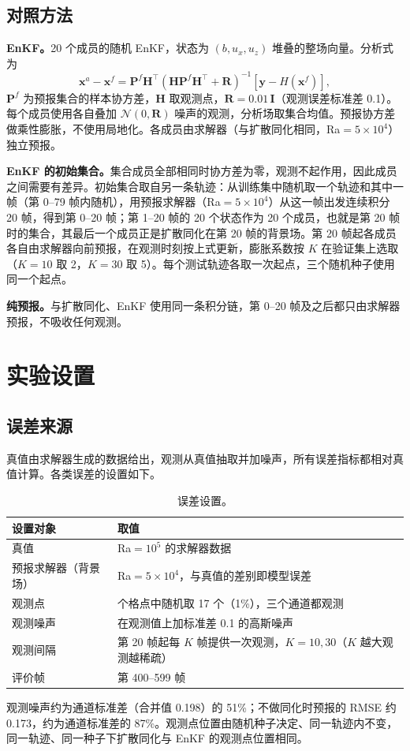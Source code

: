 \documentclass[10.5pt,a4paper]{article}
\begin{document}
\subsection{对照方法}
\textbf{EnKF。}20 个成员的随机 EnKF，状态为 $(b,u_x,u_z)$ 堆叠的整场向量。分析式为
\begin{equation}
\mathbf x^a-\mathbf x^f=\mathbf P^f\mathbf H^{\!\top}(\mathbf H\mathbf P^f\mathbf H^{\!\top}+\mathbf R)^{-1}[\mathbf y-H(\mathbf x^f)],
\end{equation}
$\mathbf P^f$ 为预报集合的样本协方差，$\mathbf H$ 取观测点，$\mathbf R=0.01\,\mathbf I$（观测误差标准差 0.1）。每个成员使用各自叠加 $\mathcal N(0,\mathbf R)$ 噪声的观测，分析场取集合均值。预报协方差做乘性膨胀，不使用局地化。各成员由求解器（与扩散同化相同，Ra$=5\times10^4$）独立预报。

\textbf{EnKF 的初始集合。}集合成员全部相同时协方差为零，观测不起作用，因此成员之间需要有差异。初始集合取自另一条轨迹：从训练集中随机取一个轨迹和其中一帧（第 0--79 帧内随机），用预报求解器（Ra$=5\times10^4$）从这一帧出发连续积分 20 帧，得到第 0--20 帧；第 1--20 帧的 20 个状态作为 20 个成员，也就是第 20 帧时的集合，其最后一个成员正是扩散同化在第 20 帧的背景场。第 20 帧起各成员各自由求解器向前预报，在观测时刻按上式更新，膨胀系数按 $K$ 在验证集上选取（$K=10$ 取 2，$K=30$ 取 5）。每个测试轨迹各取一次起点，三个随机种子使用同一个起点。

\textbf{纯预报。}与扩散同化、EnKF 使用同一条积分链，第 0--20 帧及之后都只由求解器预报，不吸收任何观测。

\section{实验设置}
\subsection{误差来源}
真值由求解器生成的数据给出，观测从真值抽取并加噪声，所有误差指标都相对真值计算。各类误差的设置如下。
\begin{table}[H]\centering\small\caption{误差设置。}
\begin{tabular}{>{\raggedright\arraybackslash}p{3cm}>{\raggedright\arraybackslash}p{9cm}}\toprule
设置对象 & 取值\\\midrule
真值 & Ra$=10^5$ 的求解器数据\\
预报求解器（背景场） & Ra$=5\times10^4$，与真值的差别即模型误差\\
观测点 & 1728 个格点中随机取 17 个（1\%），三个通道都观测\\
观测噪声 & 在观测值上加标准差 0.1 的高斯噪声\\
观测间隔 & 第 20 帧起每 $K$ 帧提供一次观测，$K=10,30$（$K$ 越大观测越稀疏）\\
评价帧 & 第 400--599 帧\\\bottomrule
\end{tabular}\end{table}
观测噪声约为通道标准差（合并值 0.198）的 51\%；不做同化时预报的 RMSE 约 0.173，约为通道标准差的 87\%。观测点位置由随机种子决定、同一轨迹内不变，同一轨迹、同一种子下扩散同化与 EnKF 的观测点位置相同。
\end{document}
